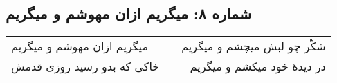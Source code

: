 \begin{center}
\section*{شماره ۸: میگریم ازان مهوشم و میگریم}
\label{sec:008}
\begin{longtable}{l p{0.5cm} r}
میگریم ازان مهوشم و میگریم
&&
شکّر چو لبش میچشم و میگریم
\\
خاکی که بدو رسید روزی قدمش
&&
در دیدهٔ خود میکشم و میگریم
\\
\end{longtable}
\end{center}
